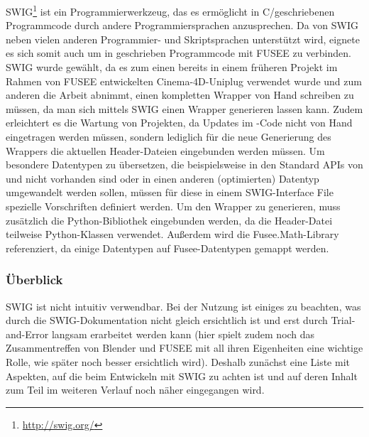 \label{sec:SWIG}

SWIG\footnote{\url{http://swig.org/}} ist ein Programmierwerkzeug, das es ermöglicht in C/\CC geschriebenen Programmcode durch andere Programmiersprachen anzusprechen. Da \CS von SWIG neben vielen anderen Programmier- und Skriptsprachen unterstützt wird, eignete es sich somit auch um in \CC geschrieben Programmcode mit FUSEE zu verbinden. SWIG wurde gewählt, da es zum einen bereits in einem früheren Projekt im Rahmen von FUSEE entwickelten Cinema-4D-Uniplug verwendet wurde und zum anderen die Arbeit abnimmt, einen kompletten Wrapper von Hand schreiben zu müssen, da man sich mittels SWIG einen Wrapper generieren lassen kann. Zudem erleichtert es die Wartung von Projekten, da Updates im \CC-Code nicht von Hand eingetragen werden müssen, sondern lediglich für die neue Generierung des Wrappers die aktuellen Header-Dateien eingebunden werden müssen. Um besondere Datentypen zu übersetzen, die beispielsweise in den Standard APIs von \CC und \CS nicht vorhanden sind oder in einen anderen (optimierten) Datentyp umgewandelt werden sollen, müssen für diese in einem SWIG-Interface File spezielle Vorschriften definiert werden.
Um den Wrapper zu generieren, muss zusätzlich die Python-Bibliothek eingebunden werden, da die Header-Datei teilweise Python-Klassen verwendet. Außerdem wird die Fusee.Math-Library referenziert, da einige Datentypen auf Fusee-Datentypen gemappt werden.

\subsubsection{Überblick}
SWIG ist nicht intuitiv verwendbar. Bei der Nutzung ist einiges zu beachten, was durch die SWIG-Dokumentation nicht gleich ersichtlich ist und erst durch Trial-and-Error langsam erarbeitet werden kann (hier spielt zudem noch das Zusammentreffen von Blender und FUSEE mit all ihren Eigenheiten eine wichtige Rolle, wie später noch besser ersichtlich wird). Deshalb zunächst eine Liste mit Aspekten, auf die beim Entwickeln mit SWIG zu achten ist und auf deren Inhalt zum Teil im weiteren Verlauf noch näher eingegangen wird.

